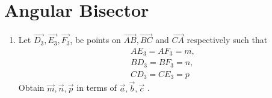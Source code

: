 \documentclass[10pt]{book}
\begin{document}
\section{Angular Bisector}
\begin{enumerate}[label=\thesection.\arabic*.,ref=\thesection.\theenumi]

\item Let $\vec{D_3}, \vec{E_3}, \vec{F_3}$, be points on $\vec{AB}, \vec{BC}$ and $\vec{CA}$ respectively such that
\begin{align}
AE_3 = AF_3 = m, \\
BD_3 = BF_3 = n,\\
CD_3 = CE_3 = p
\end{align}
Obtain $\vec{m},\vec{n},\vec{p}$ in terms of $\vec{a},\vec{b},\vec{c}$ . \\ 
\solution 


\end{enumerate}
\end{document}
